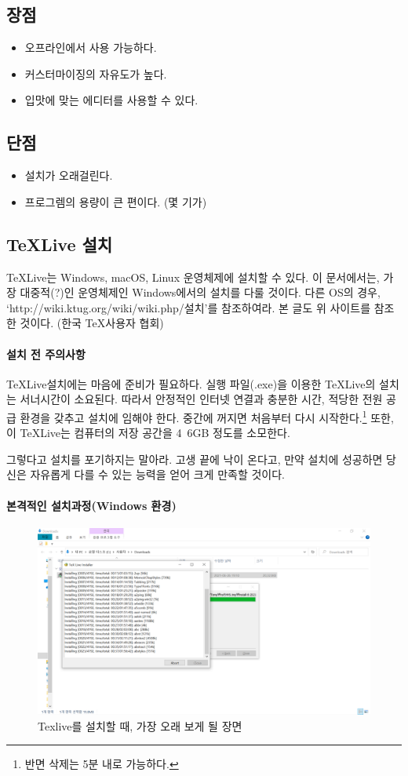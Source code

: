 \documentclass[chapter, oneside]{oblivoir}
\begin{document}
\subsection{장점}
\begin{itemize}
    \item 오프라인에서 사용 가능하다.
    \item 커스터마이징의 자유도가 높다.
    \item 입맛에 맞는 에디터를 사용할 수 있다.
\end{itemize}

\subsection{단점}
\begin{itemize}
    \item 설치가 오래걸린다.
    \item 프로그렘의 용량이 큰 편이다. (몇 기가)
\end{itemize}


\subsection{TeXLive 설치}
TeXLive는 Windows, macOS, Linux 운영체제에 설치할 수 있다. 이 문서에서는, 가장 대중적(?)인 운영체제인 Windows에서의 설치를 다룰 것이다. 다른 OS의 경우, `http://wiki.ktug.org/wiki/wiki.php/설치'를 참조하여라. 본 글도 위 사이트를 참조한 것이다. (한국 \TeX 사용자 협회)

\paragraph{설치 전 주의사항}
TeXLive설치에는 마음에 준비가 필요하다. 실행 파일(.exe)을 이용한 TeXLive의 설치는 서너시간이 소요된다. 따라서 안정적인 인터넷 연결과 충분한 시간, 적당한 전원 공급 환경을 갖추고 설치에 임해야 한다. 중간에 꺼지면 처음부터 다시 시작한다.\footnote{반면 삭제는 5분 내로 가능하다.}
또한, 이 TeXLive는 컴퓨터의 저장 공간을 4~6GB 정도를 소모한다.

그렇다고 설치를 포기하지는 말아라. 고생 끝에 낙이 온다고, 만약 설치에 성공하면 당신은  자유롭게 다를 수 있는 능력을 얻어 크게 만족할 것이다.

\paragraph{본격적인 설치과정(Windows 환경)}
\begin{figure}[h!]
\centering
\includegraphics[width=.7\textwidth]{img/5/texlive_install.png}
\caption{Texlive를 설치할 때, 가장 오래 보게 될 장면}
\label{texlive:install}
\end{figure}
\end{document}

